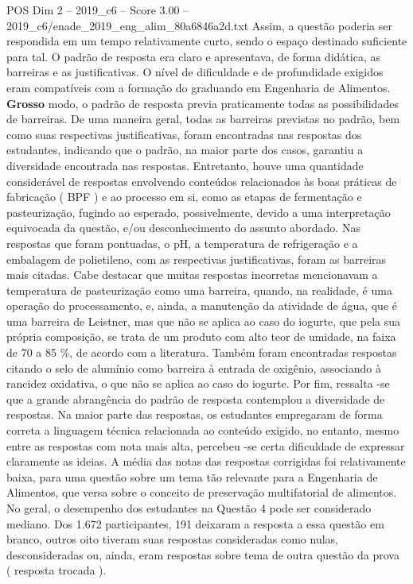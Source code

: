 \begin{textsample}{POS Dim 2 – 2019\_c6 – Score 3.00 – 2019\_c6/enade\_2019\_eng\_alim\_80a6846a2d.txt}
Assim, a questão poderia ser respondida em um tempo relativamente curto, sendo o espaço destinado suficiente para tal.
O padrão de resposta era claro e apresentava, de forma didática, as barreiras e as justificativas.
O nível de dificuldade e de profundidade exigidos eram compatíveis com a formação do graduando em Engenharia de Alimentos. \textbf{Grosso} modo, o padrão de resposta previa praticamente todas as possibilidades de barreiras.
De uma maneira geral, todas as barreiras previstas no padrão, bem como suas respectivas justificativas, foram encontradas nas respostas dos estudantes, indicando que o padrão, na maior parte dos casos, garantiu a diversidade encontrada nas respostas.
Entretanto, houve uma quantidade considerável de respostas envolvendo conteúdos relacionados às boas práticas de fabricação ( BPF ) e ao processo em si, como as etapas de fermentação e pasteurização, fugindo ao esperado, possivelmente, devido a uma interpretação equivocada da questão, e/ou desconhecimento do assunto abordado.
Nas respostas que foram pontuadas, o pH, a temperatura de refrigeração e a embalagem de polietileno, com as respectivas justificativas, foram as barreiras mais citadas.
Cabe destacar que muitas respostas incorretas mencionavam a temperatura de pasteurização como uma barreira, quando, na realidade, é uma operação do processamento, e, ainda, a manutenção da atividade de água, que é uma barreira de Leistner, mas que não se aplica ao caso do iogurte, que pela sua própria composição, se trata de um produto com alto teor de umidade, na faixa de 70 a 85 \%, de acordo com a literatura.
Também foram encontradas respostas citando o selo de alumínio como barreira à entrada de oxigênio, associando à rancidez oxidativa, o que não se aplica ao caso do iogurte.
Por fim, ressalta -se que a grande abrangência do padrão de resposta contemplou a diversidade de respostas.
Na maior parte das respostas, os estudantes empregaram de forma correta a linguagem técnica relacionada ao conteúdo exigido, no entanto, mesmo entre as respostas com nota mais alta, percebeu -se certa dificuldade de expressar claramente as ideias.
A média das notas das respostas corrigidas foi relativamente baixa, para uma questão sobre um tema tão relevante para a Engenharia de Alimentos, que versa sobre o conceito de preservação multifatorial de alimentos.
No geral, o desempenho dos estudantes na Questão 4 pode ser considerado mediano.
Dos 1.672 participantes, 191 deixaram a resposta a essa questão em branco, outros oito tiveram suas respostas consideradas como nulas, desconsideradas ou, ainda, eram respostas sobre tema de outra questão da prova ( resposta trocada ).

\end{textsample}
